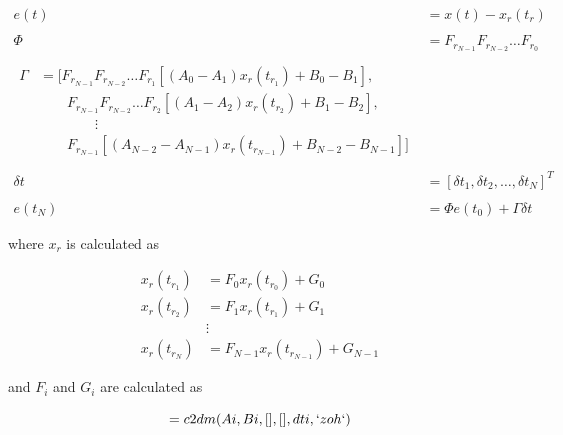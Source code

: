 \begin{align}
	e(t) &= x(t) - x_r(t_r) \\ \nonumber \\
	\Phi &= F_{r_{N-1}} F_{r_{N-2}} \ldots F_{r_0} \\ \nonumber \\
	\begin{split}
		\Gamma &= \Big[ F_{r_{N-1}}F_{r_{N-2}} \ldots F_{r_1} [(A_0 - A_1) x_r(t_{r_1}) + B_0 - B_1], \\
		& \qquad F_{r_{N-1}}F_{r_{N-2}} \ldots F_{r_2} [(A_1 - A_2) x_r(t_{r_2}) + B_1 - B_2], \\
		& \qquad \qquad \vdots \\
		& \qquad F_{r_{N-1}}[(A_{N-2} - A_{N-1}) x_r(t_{r_{N-1}}) + B_{N-2} - B_{N-1}]\Big]
	\end{split} \\ \nonumber \\
	\delta t &= [\delta t_1, \delta t_2, \ldots, \delta t_N]^T \\ \nonumber \\
	e(t_N) &= \Phi e(t_0) + \Gamma \delta t
\end{align}

where $x_r$ is calculated as

\begin{align}
	x_r(t_{r_1}) &= F_0 x_r(t_{r_0}) + G_0 \\
    x_r(t_{r_2}) &= F_1 x_r(t_{r_1}) + G_1 \\
    &\vdots \nonumber \\
    x_r(t_{r_N}) &= F_{N-1} x_r(t_{r_{N-1}}) + G_{N-1}
\end{align}

and $F_i$ and $G_i$ are calculated as

\begin{equation}
	[F_i, G_i] = c2dm(Ai, Bi, [], [], dti, `zoh`)
\end{equation}